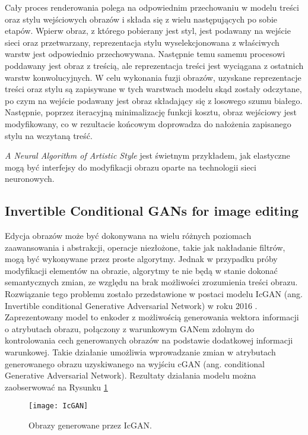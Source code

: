     Cały proces renderowania polega na odpowiednim przechowaniu w modelu treści
    oraz stylu wejściowych obrazów i składa się z wielu następujących po sobie etapów.
    Wpierw obraz, z którego pobierany jest styl, jest podawany na
    wejście sieci oraz przetwarzany, reprezentacja stylu wyselekcjonowana z
    właściwych warstw jest odpowiednio przechowywana. Następnie temu samemu
    procesowi poddawany jest obraz z treścią, ale reprezentacja treści jest wyciągana z ostatnich
    warstw konwolucyjnych.
    W celu wykonania fuzji obrazów, uzyskane reprezentacje treści oraz stylu są
    zapisywane w tych warstwach modelu skąd zostały odczytane, po czym na wejście
    podawany jest obraz składający się z losowego szumu białego.
    Następnie, poprzez iteracyjną minimalizację funkcji kosztu, obraz wejściowy jest modyfikowany, co w rezultacie końcowym doprowadza do nałożenia zapisanego
    stylu na wczytaną treść.

    \textit{A Neural Algorithm of Artistic Style} jest świetnym przykładem, jak elastyczne
    mogą być interfejsy do modyfikacji obrazu oparte na technologii sieci neuronowych.

  \subsection{Invertible Conditional GANs for image editing}
    Edycja obrazów może być dokonywana na wielu różnych poziomach zaawansowania
    i abstrakcji, operacje niezłożone, takie jak nakładanie filtrów, mogą być
    wykonywane przez proste algorytmy. Jednak w przypadku próby modyfikacji
    elementów na obrazie, algorytmy te nie będą w stanie dokonać semantycznych
    zmian, ze względu na brak możliwości zrozumienia treści obrazu. Rozwiązanie
    tego problemu zostało przedstawione w postaci modelu IcGAN
    (ang. Invertible conditional Generative Adversarial Network) w roku 2016
    \cite{gan_editing}. Zaprezentowany model to enkoder z możliwością
    generowania wektora informacji o atrybutach obrazu, połączony z warunkowym
    GANem zdolnym do kontrolowania cech generowanych obrazów na podstawie dodatkowej
    informacji warunkowej. Takie działanie umożliwia wprowadzanie zmian w
    atrybutach generowanego obrazu uzyskiwanego na wyjściu cGAN (ang. conditional Generative
    Adversarial Network). Rezultaty działania modelu można zaobserwować na
    Rysunku \ref{fig:IcGAN}

    \begin{figure}[ht]
      \centering
      \texttt{[image: IcGAN]}
      \caption[Obrazy generowane przez IcGAN - źródło: \cite{gan_editing}]{Obrazy generowane przez IcGAN.}
      \label{fig:IcGAN}
    \end{figure}

